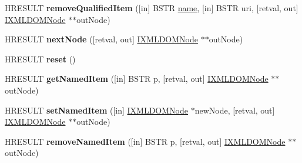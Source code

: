 \begin{DoxyCompactItemize}
\item 
\mbox{\label{interface_m_s_x_m_l2_1_1_i_x_m_l_d_o_m_named_node_map_a4c6e8120c7b8f5ea03817bd82a96f901}} 
H\+R\+E\+S\+U\+LT {\bfseries remove\+Qualified\+Item} (\mbox{[}in\mbox{]} B\+S\+TR \hyperlink{structname}{name}, \mbox{[}in\mbox{]} B\+S\+TR uri, \mbox{[}retval, out\mbox{]} \hyperlink{interface_m_s_x_m_l2_1_1_i_x_m_l_d_o_m_node}{I\+X\+M\+L\+D\+O\+M\+Node} $\ast$$\ast$out\+Node)
\item 
\mbox{\label{interface_m_s_x_m_l2_1_1_i_x_m_l_d_o_m_named_node_map_a383e8791b759a3c8a896f90a5e872fab}} 
H\+R\+E\+S\+U\+LT {\bfseries next\+Node} (\mbox{[}retval, out\mbox{]} \hyperlink{interface_m_s_x_m_l2_1_1_i_x_m_l_d_o_m_node}{I\+X\+M\+L\+D\+O\+M\+Node} $\ast$$\ast$out\+Node)
\item 
\mbox{\label{interface_m_s_x_m_l2_1_1_i_x_m_l_d_o_m_named_node_map_adf2d41ce8373cab4719347da71b79ce3}} 
H\+R\+E\+S\+U\+LT {\bfseries reset} ()
\item 
\mbox{\label{interface_m_s_x_m_l2_1_1_i_x_m_l_d_o_m_named_node_map_ac027b2660e71cbd7c2b17e4d7b0f5d8b}} 
H\+R\+E\+S\+U\+LT {\bfseries get\+Named\+Item} (\mbox{[}in\mbox{]} B\+S\+TR p, \mbox{[}retval, out\mbox{]} \hyperlink{interface_m_s_x_m_l2_1_1_i_x_m_l_d_o_m_node}{I\+X\+M\+L\+D\+O\+M\+Node} $\ast$$\ast$out\+Node)
\item 
\mbox{\label{interface_m_s_x_m_l2_1_1_i_x_m_l_d_o_m_named_node_map_a166c28287818d90b3e5c91b38ec03563}} 
H\+R\+E\+S\+U\+LT {\bfseries set\+Named\+Item} (\mbox{[}in\mbox{]} \hyperlink{interface_m_s_x_m_l2_1_1_i_x_m_l_d_o_m_node}{I\+X\+M\+L\+D\+O\+M\+Node} $\ast$new\+Node, \mbox{[}retval, out\mbox{]} \hyperlink{interface_m_s_x_m_l2_1_1_i_x_m_l_d_o_m_node}{I\+X\+M\+L\+D\+O\+M\+Node} $\ast$$\ast$out\+Node)
\item 
\mbox{\label{interface_m_s_x_m_l2_1_1_i_x_m_l_d_o_m_named_node_map_afe908ace988c9a6a7e35662eaea862d9}} 
H\+R\+E\+S\+U\+LT {\bfseries remove\+Named\+Item} (\mbox{[}in\mbox{]} B\+S\+TR p, \mbox{[}retval, out\mbox{]} \hyperlink{interface_m_s_x_m_l2_1_1_i_x_m_l_d_o_m_node}{I\+X\+M\+L\+D\+O\+M\+Node} $\ast$$\ast$out\+Node)
$$
\end{DoxyCompactItemize}
